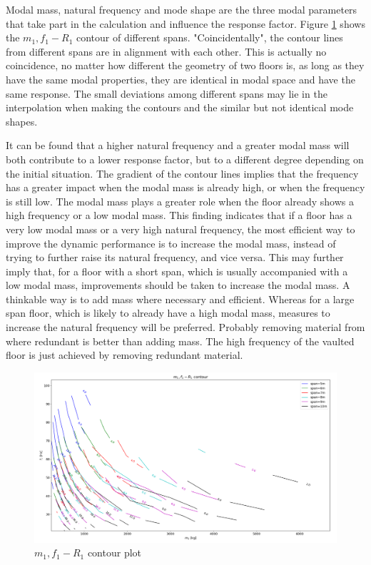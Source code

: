 Modal mass, natural frequency and mode shape are the three modal parameters that take part in the calculation and influence the response factor. Figure \ref{fig:m1,f1_R1_contour} shows the $m_1,f_1-R_1$ contour of different spans. "Coincidentally", the contour lines from different spans are in alignment with each other. This is actually no coincidence, no matter how different the geometry of two floors is, as long as they have the same modal properties, they are identical in modal space and have the same response. The small deviations among different spans may lie in the interpolation when making the contours and the similar but not identical mode shapes. 

It can be found that a higher natural frequency and a greater modal mass will both contribute to a lower response factor, but to a different degree depending on the initial situation. The gradient of the contour lines implies that the frequency has a greater impact when the modal mass is already high, or when the frequency is still low. The modal mass plays a greater role when the floor already shows a high frequency or a low modal mass. This finding indicates that if a floor has a very low modal mass or a very high natural frequency, the most efficient way to improve the dynamic performance is to increase the modal mass, instead of trying to further raise its natural frequency, and vice versa. This may further imply that, for a floor with a short span, which is usually accompanied with a low modal mass, improvements should be taken to increase the modal mass. A thinkable way is to add mass where  necessary and efficient. Whereas for a large span floor, which is likely to already have a high modal mass, measures to increase the natural frequency will be preferred. Probably removing material from where redundant is better than adding mass. The high frequency of the vaulted floor is just achieved by removing redundant material. 

\begin{figure}[H]
\centering
\includegraphics[width=1\textwidth]{images/m1,f1_R1}
\caption{$m_1,f_1-R_1$ contour plot}
\label{fig:m1,f1_R1_contour}
\end{figure}

